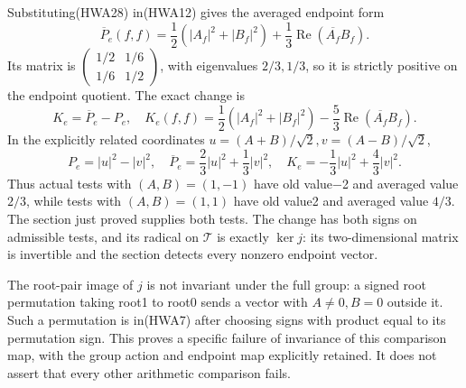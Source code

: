 \documentclass[
  10pt,
  a4paper,
]{article}
\begin{document}
Substituting(HWA28) in(HWA12) gives the averaged endpoint form \[
\overline P_e(f,f)=\frac12(|A_f|^2+|B_f|^2)
 +\frac13\operatorname{Re}(\overline{A_f}B_f).
\tag{HWA30}
\] Its matrix is
\(\left(\begin{smallmatrix}1/2&1/6\\1/6&1/2\end{smallmatrix}\right)\),
with eigenvalues \(2/3,1/3\), so it is strictly positive on the endpoint
quotient. The exact change is \[
K_e=\overline P_e-P_e,
\quad
K_e(f,f)=\frac12(|A_f|^2+|B_f|^2)
-\frac53\operatorname{Re}(\overline{A_f}B_f).
\tag{HWA31}
\] In the explicitly related coordinates
\(u=(A+B)/\sqrt2,v=(A-B)/\sqrt2\), \[
P_e=|u|^2-|v|^2,
\quad\overline P_e=\frac23|u|^2+\frac13|v|^2,
\quad K_e=-\frac13|u|^2+\frac43|v|^2.
\tag{HWA32}
\] Thus actual tests with \((A,B)=(1,-1)\) have old value−2 and averaged
value \(2/3\), while tests with \((A,B)=(1,1)\) have old value2 and
averaged value \(4/3\). The section just proved supplies both tests. The
change has both signs on admissible tests, and its radical on
\(\mathcal T\) is exactly \(\ker j\): its two-dimensional matrix is
invertible and the section detects every nonzero endpoint vector.

The root-pair image of \(j\) is not invariant under the full group: a
signed root permutation taking root1 to root0 sends a vector with
\(A\ne0,B=0\) outside it. Such a permutation is in(HWA7) after choosing
signs with product equal to its permutation sign. This proves a specific
failure of invariance of this comparison map, with the group action and
endpoint map explicitly retained. It does not assert that every other
arithmetic comparison fails.
\end{document}
